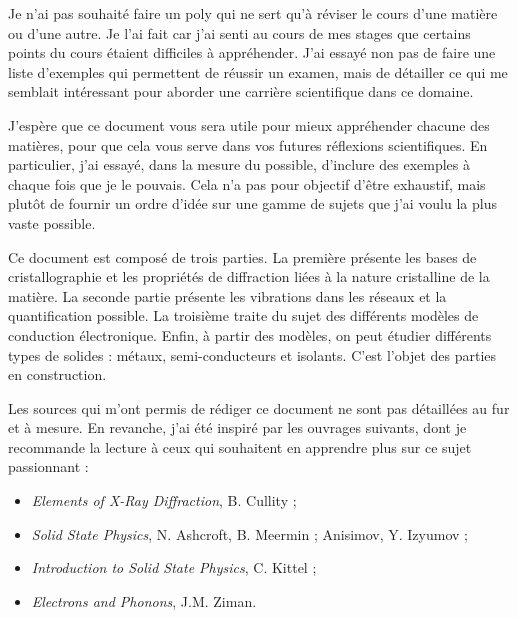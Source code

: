 \documentclass[a4paper,justified,twoside,nobib]{tufte-book}
\renewcommand{\=}[1]{\stackrel{#1}{=}} %
\begin{document}
Je n'ai pas souhaité faire un poly qui ne sert qu'à réviser le cours d'une 
matière ou d'une autre. Je l'ai fait car j'ai senti au cours de mes stages que
certains points du cours étaient difficiles à appréhender. J'ai essayé non pas de
faire une liste d'exemples qui permettent de réussir un examen, mais de
détailler ce qui me semblait intéressant pour aborder une carrière 
scientifique dans ce domaine.

J'espère que ce document vous sera utile pour mieux appréhender chacune des 
matières, pour que cela vous serve dans vos futures réflexions scientifiques.
En particulier, j'ai essayé, dans la mesure du possible, d'inclure des exemples à 
chaque fois que je le pouvais. Cela n'a pas pour objectif d'être exhaustif, mais 
plutôt de fournir un ordre d'idée sur une gamme de sujets que j'ai voulu la plus 
vaste possible.

Ce document est composé de trois parties. La première présente les bases de
cristallographie et les propriétés de diffraction liées à la nature cristalline
de la matière.
La seconde partie présente les vibrations dans les réseaux et la quantification 
possible.
La troisième traite du sujet des différents modèles de conduction électronique.
Enfin, à partir des modèles, on peut étudier différents types de solides : 
métaux, semi-conducteurs et isolants. C'est l'objet des parties en construction.

Les sources qui m'ont permis de rédiger ce document ne sont pas détaillées au fur
et à mesure. En revanche, j'ai été inspiré par les ouvrages suivants, dont je
recommande la lecture à ceux qui souhaitent en apprendre plus sur ce sujet 
passionnant :

\begin{itemize}
    \item \emph{Elements of X-Ray Diffraction}, B. Cullity ;
    \item \emph{Solid State Physics}, N. Ashcroft, B. Meermin ;
        Anisimov, Y. Izyumov ;
    \item \emph{Introduction to Solid State Physics}, C. Kittel ;
    \item \emph{Electrons and Phonons}, J.M. Ziman. 
\end{itemize}
\end{document}
